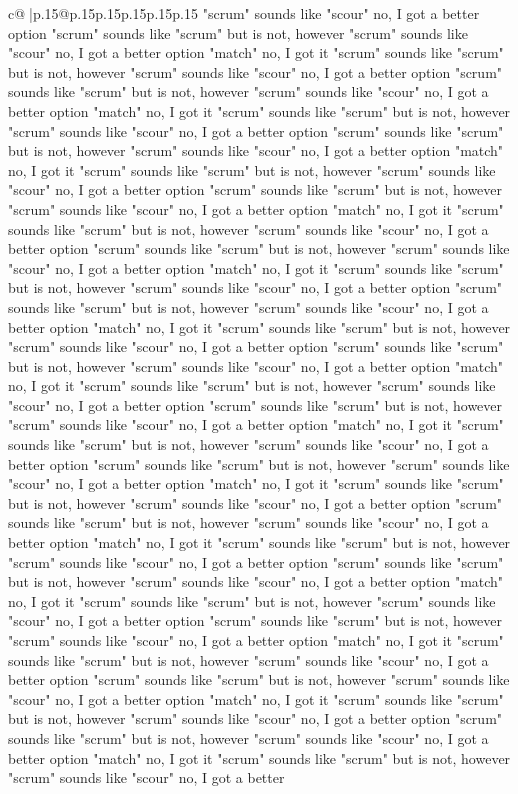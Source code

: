 \documentclass{article}
\begin{document}
{\begin{supertabular}{c@{$\;$}|p{.15\linewidth}@{}p{.15\linewidth}p{.15\linewidth}p{.15\linewidth}p{.15\linewidth}p{.15\linewidth}}
{{{"scrum" sounds like "scour" no, I got a better option "scrum" sounds like "scrum" but is not, however "scrum" sounds like "scour" no, I got a better option "match" no, I got it "scrum" sounds like "scrum" but is not, however "scrum" sounds like "scour" no, I got a better option "scrum" sounds like "scrum" but is not, however "scrum" sounds like "scour" no, I got a better option "match" no, I got it "scrum" sounds like "scrum" but is not, however "scrum" sounds like "scour" no, I got a better option "scrum" sounds like "scrum" but is not, however "scrum" sounds like "scour" no, I got a better option "match" no, I got it "scrum" sounds like "scrum" but is not, however "scrum" sounds like "scour" no, I got a better option "scrum" sounds like "scrum" but is not, however "scrum" sounds like "scour" no, I got a better option "match" no, I got it "scrum" sounds like "scrum" but is not, however "scrum" sounds like "scour" no, I got a better option "scrum" sounds like "scrum" but is not, however "scrum" sounds like "scour" no, I got a better option "match" no, I got it "scrum" sounds like "scrum" but is not, however "scrum" sounds like "scour" no, I got a better option "scrum" sounds like "scrum" but is not, however "scrum" sounds like "scour" no, I got a better option "match" no, I got it "scrum" sounds like "scrum" but is not, however "scrum" sounds like "scour" no, I got a better option "scrum" sounds like "scrum" but is not, however "scrum" sounds like "scour" no, I got a better option "match" no, I got it "scrum" sounds like "scrum" but is not, however "scrum" sounds like "scour" no, I got a better option "scrum" sounds like "scrum" but is not, however "scrum" sounds like "scour" no, I got a better option "match" no, I got it "scrum" sounds like "scrum" but is not, however "scrum" sounds like "scour" no, I got a better option "scrum" sounds like "scrum" but is not, however "scrum" sounds like "scour" no, I got a better option "match" no, I got it "scrum" sounds like "scrum" but is not, however "scrum" sounds like "scour" no, I got a better option "scrum" sounds like "scrum" but is not, however "scrum" sounds like "scour" no, I got a better option "match" no, I got it "scrum" sounds like "scrum" but is not, however "scrum" sounds like "scour" no, I got a better option "scrum" sounds like "scrum" but is not, however "scrum" sounds like "scour" no, I got a better option "match" no, I got it "scrum" sounds like "scrum" but is not, however "scrum" sounds like "scour" no, I got a better option "scrum" sounds like "scrum" but is not, however "scrum" sounds like "scour" no, I got a better option "match" no, I got it "scrum" sounds like "scrum" but is not, however "scrum" sounds like "scour" no, I got a better option "scrum" sounds like "scrum" but is not, however "scrum" sounds like "scour" no, I got a better option "match" no, I got it "scrum" sounds like "scrum" but is not, however "scrum" sounds like "scour" no, I got a better option "scrum" sounds like "scrum" but is not, however "scrum" sounds like "scour" no, I got a better option "match" no, I got it "scrum" sounds like "scrum" but is not, however "scrum" sounds like "scour" no, I got a better }}}
\end{supertabular}}
\end{document}
